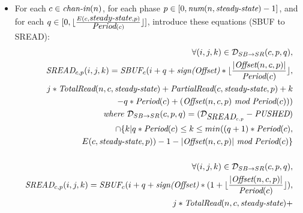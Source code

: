 \begin{itemize}

\item For each $c \in \mbox{\it chan-in}(n)$, for each phase $p \in [0,
\mbox{\it num}(n, \mbox{\it steady-state})-1]$, and for each $q \in [0, \lfloor
\frac{E(c, \mbox{\it steady-state}, p)}{\mbox{\it Period}(c)} \rfloor]$, introduce
these equations (SBUF to SREAD):
\begin{align*}
\forall (i,j,k) \in {\cal D}_{SB \rightarrow SR}(c,p,q), \\
\mt{SREAD}_{c, p}(i,j,k) = 
    \mt{SBUF}_{c}(i+q+
                  \mt{sign(Offset)}*\lfloor \frac{|\mt{Offset}(n,c,p)|}{\mt{Period}(c)} \rfloor, \\
                  j*\mt{TotalRead}(n,c,\mt{steady-state}) + 
                    \mt{PartialRead}(c,\mt{steady-state},p) + k \\
                   - q * \mt{Period}(c) + (\mt{Offset}(n,c,p)~\mt{mod}~\mt{Period}(c))) \\
\mt{where }{\cal D}_{SB \rightarrow SR}(c,p,q) = 
  ({\cal D}_{\mt{SREAD}_{c, p}} - \mt{PUSHED}) \\
                         \cap \{ k | q * \mt{Period}(c) 
                                \le k 
                                \le min((q+1)*\mt{Period}(c),  \\
                                        E(c, \mt{steady-state}, p)) - 1 
                                        - |\mt{Offset}(n,c,p)|~\mt{mod}~\mt{Period}(c) \} \\ ~ \\
%
%
\forall (i,j,k) \in {\cal D}_{SB \rightarrow SR}(c,p,q), \\
\mt{SREAD}_{c, p}(i,j,k) = 
    \mt{SBUF}_{c}(i+q+
                  \mt{sign(Offset)}*(1 + \lfloor \frac{|\mt{Offset}(n,c,p)|}{\mt{Period}(c)} \rfloor), \\
                  j*\mt{TotalRead}(n,c,\mt{steady-state}) + 

\end{align*}
\end{itemize}
